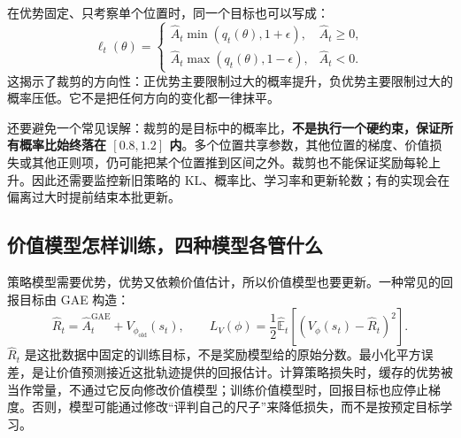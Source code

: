 在优势固定、只考察单个位置时，同一个目标也可以写成：
\[
    \ell_t(\theta)=
    \begin{cases}
      \widehat A_t\min(q_t(\theta),1+\epsilon),
          & \widehat A_t\geq 0,\\
      \widehat A_t\max(q_t(\theta),1-\epsilon),
          & \widehat A_t<0.
    \end{cases}
\]
这揭示了裁剪的方向性：正优势主要限制过大的概率提升，负优势主要限制过大的概率压低。它不是把任何方向的变化都一律抹平。

还要避免一个常见误解：裁剪的是目标中的概率比，\textbf{不是执行一个硬约束，保证所有概率比始终落在 $[0.8,1.2]$ 内}。多个位置共享参数，其他位置的梯度、价值损失或其他正则项，仍可能把某个位置推到区间之外。裁剪也不能保证奖励每轮上升。因此还需要监控新旧策略的 KL、概率比、学习率和更新轮数；有的实现会在偏离过大时提前结束本批更新。

\subsection{价值模型怎样训练，四种模型各管什么}

策略模型需要优势，优势又依赖价值估计，所以价值模型也要更新。一种常见的回报目标由 GAE 构造：
\[
    \widehat R_t=\widehat A_t^{\mathrm{GAE}}
                   +V_{\phi_{\mathrm{old}}}(s_t),
    \qquad
    L_V(\phi)=\frac12\widehat{\mathbb E}_t
                  \left[(V_\phi(s_t)-\widehat R_t)^2\right].
\]
$\widehat R_t$ 是这批数据中固定的训练目标，不是奖励模型给的原始分数。最小化平方误差，是让价值预测接近这批轨迹提供的回报估计。计算策略损失时，缓存的优势被当作常量，不通过它反向修改价值模型；训练价值模型时，回报目标也应停止梯度。否则，模型可能通过修改``评判自己的尺子''来降低损失，而不是按预定目标学习。

